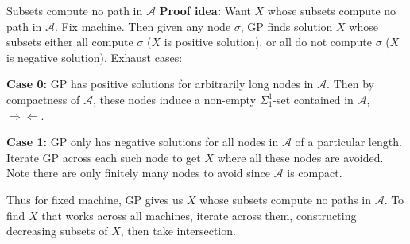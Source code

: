 \begin{frame}{Subsets compute no path in $\mathcal{A}$}
  \textbf{Proof idea:} Want $X$ whose subsets compute no path in 
  $\mathcal{A}$. Fix machine. Then given any node $\sigma$, GP finds
  solution $X$ whose subsets either all compute $\sigma$ ($X$ is positive
  solution), or all do not compute $\sigma$ ($X$ is negative solution).
  Exhaust cases:

  \vspace{1em}
  \textbf{Case 0:} GP has positive solutions for arbitrarily long nodes in
  $\mathcal{A}$. Then by compactness of $\mathcal{A}$, these nodes induce a
  non-empty $\Sigma_1^1$-set contained in $\mathcal{A}$,
  $\Rightarrow\Leftarrow$.

  \vspace{0.5em}
  \textbf{Case 1:} GP only has negative solutions for all nodes in
  $\mathcal{A}$ of a particular length. Iterate GP across each such node to
  get $X$ where all these nodes are avoided. Note there are only finitely
  many nodes to avoid since $\mathcal{A}$ is compact.


  \vspace{1em}
  Thus for fixed machine, GP gives us $X$ whose subsets compute no paths in
  $\mathcal{A}$. To find $X$ that works across all machines, iterate across
  them, constructing decreasing subsets of $X$, then take intersection.
\end{frame}

